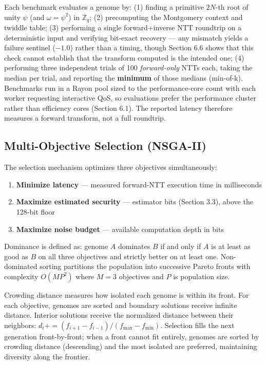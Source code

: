 Each benchmark evaluates a genome by: (1) finding a primitive \(2N\)-th root of unity \(\psi\) (and \(\omega = \psi^2\)) in \(\mathbb{Z}_q\); (2) precomputing the Montgomery context and twiddle table; (3) performing a single forward+inverse NTT roundtrip on a deterministic input and verifying bit-exact recovery --- any mismatch yields a failure sentinel (\(-1.0\)) rather than a timing, though Section 6.6 shows that this check cannot establish that the transform computed is the intended one; (4) performing three independent trials of 100 \emph{forward-only} NTTs each, taking the median per trial, and reporting the \textbf{minimum} of those medians (min-of-k). Benchmarks run in a Rayon pool sized to the performance-core count with each worker requesting interactive QoS, so evaluations prefer the performance cluster rather than efficiency cores (Section 6.1). The reported latency therefore measures a forward transform, not a full roundtrip.

\subsection{Multi-Objective Selection (NSGA-II)}\label{multi-objective-selection-nsga-ii}

The selection mechanism optimizes three objectives simultaneously:

\begin{enumerate}
\def\labelenumi{\arabic{enumi}.}
\tightlist
\item
  \textbf{Minimize latency} --- measured forward-NTT execution time in milliseconds
\item
  \textbf{Maximize estimated security} --- estimator bits (Section 3.3), above the 128-bit floor
\item
  \textbf{Maximize noise budget} --- available computation depth in bits
\end{enumerate}

Dominance is defined as: genome \(A\) dominates \(B\) if and only if \(A\) is at least as good as \(B\) on all three objectives and strictly better on at least one. Non-dominated sorting partitions the population into successive Pareto fronts with complexity \(O(MP^2)\) where \(M = 3\) objectives and \(P\) is population size.

Crowding distance measures how isolated each genome is within its front. For each objective, genomes are sorted and boundary solutions receive infinite distance. Interior solutions receive the normalized distance between their neighbors: \(d_i += (f_{i+1} - f_{i-1}) / (f_{\max} - f_{\min})\). Selection fills the next generation front-by-front; when a front cannot fit entirely, genomes are sorted by crowding distance (descending) and the most isolated are preferred, maintaining diversity along the frontier.

